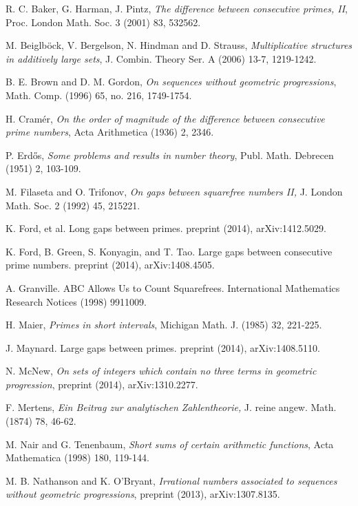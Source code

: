 \documentclass[12pt,english,BCOR7.5mm]{amsart}
\numberwithin{equation}{section}
\numberwithin{figure}{section}
\theoremstyle{definition}
\theoremstyle{plain}
\theoremstyle{plain}
\theoremstyle{plain}
\theoremstyle{definition}
\theoremstyle{plain}
\theoremstyle{plain}
\begin{document}
\begin{thebibliography}{10}
R. C. Baker, G. Harman, J. Pintz, \emph{The difference
between consecutive primes, II}, Proc. London Math. Soc. 3 (2001)
83, 532\textendash{}562.

M. Beiglböck, V. Bergelson, N. Hindman and D. Strauss,
\emph{Multiplicative structures in additively large sets}, J. Combin.
Theory Ser. A (2006) 13-7, 1219-1242.

B. E. Brown and D. M. Gordon, \emph{On sequences without
geometric progressions}, Math. Comp. (1996) 65, no. 216, 1749-1754.

H. Cramér, \emph{On the order of magnitude of the
difference between consecutive prime numbers}, Acta Arithmetica (1936)
2, 23\textendash{}46.

P. Erd\H{o}s, \emph{Some problems and results in number
theory}, Publ. Math. Debrecen (1951) 2, 103-109. 

M. Filaseta and O. Trifonov, \emph{On gaps between squarefree
numbers II, }J. London Math. Soc. 2 (1992) 45, 215\textendash{}221.

K. Ford, et al. \textquotedbl{}Long gaps between primes.\textquotedbl{}
preprint (2014), arXiv:1412.5029.

K. Ford, B. Green, S. Konyagin, and T. Tao. Large gaps
between consecutive prime numbers. preprint (2014), arXiv:1408.4505.

A. Granville. \textquotedbl{}ABC Allows Us to
Count Squarefrees\textquotedbl{}. International Mathematics Research
Notices (1998) 991\textendash{}1009.

H. Maier, \emph{Primes in short intervals}, Michigan
Math. J. (1985) 32, 221-225.

J. Maynard. \textquotedbl{}Large gaps between primes.\textquotedbl{}
preprint (2014), arXiv:1408.5110.

N. McNew, \emph{On sets of integers which contain
no three terms in geometric progression}, preprint (2014), arXiv:1310.2277.

F. Mertens, \emph{Ein Beitrag zur analytischen Zahlentheorie,
}J. reine angew. Math. (1874) 78, 46-62.

M. Nair and G. Tenenbaum, \emph{Short sums of certain
arithmetic functions}, Acta Mathematica (1998) 180, 119-144.

M. B. Nathanson and K. O\textquoteright{}Bryant, \emph{Irrational
numbers associated to sequences without geometric progressions}, preprint
(2013), arXiv:1307.8135.


\end{thebibliography}
\end{document}
